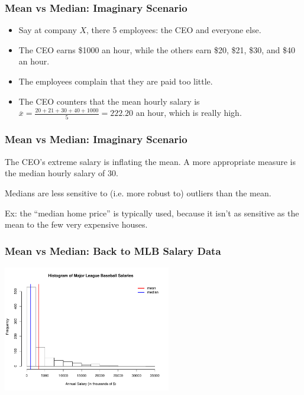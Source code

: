 \documentclass[handout]{beamer}
\newcommand{\blue}[1]{\textcolor{blue2}{#1}}
\begin{document}
\begin{frame}
\frametitle{Mean vs Median: Imaginary Scenario}


\begin{itemize}
\item Say at company $X$, there 5 employees:  the CEO and everyone else.  
\pause\item The CEO earns \$1000 an hour, while the others earn \$20, \$21, \$30, and \$40 an hour. 
\pause\item The employees complain that they are paid too little.  
\pause\item The CEO counters that the mean hourly salary is $\overline{x}=\frac{20+21+30+40+1000}{5} = 222.20$ an hour, which is really high.
\end{itemize}

\end{frame}


\begin{frame}
\frametitle{Mean vs Median: Imaginary Scenario}
The CEO's extreme salary is inflating the mean.  A more appropriate measure is the median hourly salary of $30$.

\vspace{0.5cm}

\pause Medians are less sensitive to (i.e. more \blue{robust} to) \blue{outliers} than the mean.

\vspace{0.5cm}

\pause Ex: the ``median home price'' is typically used, because it isn't as sensitive as the mean to the few very expensive houses.
\end{frame}


\begin{frame}
\frametitle{Mean vs Median: Back to MLB Salary Data}

\begin{center}
\includegraphics[height=5.5cm]{figure/MLB2.pdf}
\end{center}

\end{frame}
\end{document}

